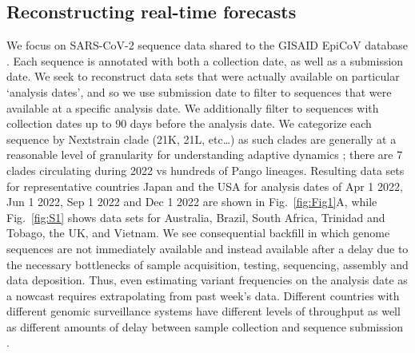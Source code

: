 \subsection*{Reconstructing real-time forecasts}

We focus on SARS-CoV-2 sequence data shared to the GISAID EpiCoV database \cite{shu2017gisaid}.
Each sequence is annotated with both a collection date, as well as a submission date.
We seek to reconstruct data sets that were actually available on particular `analysis dates', and so we use submission date to filter to sequences that were available at a specific analysis date.
We additionally filter to sequences with collection dates up to 90 days before the analysis date.
We categorize each sequence by Nextstrain clade (21K, 21L, etc\dots) as such clades are generally at a reasonable level of granularity for understanding adaptive dynamics \cite{bloom2023fitness}; there are 7 clades circulating during 2022 vs hundreds of Pango lineages.
Resulting data sets for representative countries Japan and the USA for analysis dates of Apr 1 2022, Jun 1 2022, Sep 1 2022 and Dec 1 2022 are shown in Fig.~\ref{fig:Fig1}A, while Fig.~\ref{fig:S1} shows data sets for Australia, Brazil, South Africa, Trinidad and Tobago, the UK, and Vietnam.
We see consequential backfill in which genome sequences are not immediately available and instead available after a delay due to the necessary bottlenecks of sample acquisition, testing, sequencing, assembly and data deposition.
Thus, even estimating variant frequencies on the analysis date as a nowcast requires extrapolating from past week's data.
Different countries with different genomic surveillance systems have different levels of throughput as well as different amounts of delay between sample collection and sequence submission \cite{brito2022global}.

